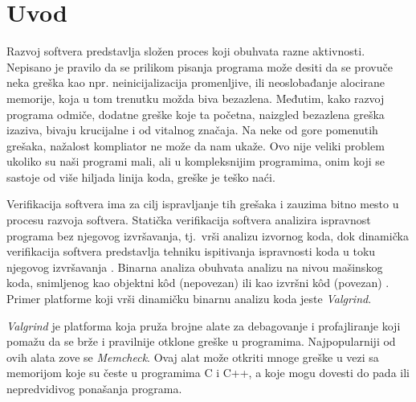 \documentclass[12pt,oneside]{memoir}
\theoremstyle{plain}
\theoremstyle{definition}
\begin{document}
\frontmatter
\naslovna
\komisija
\apstrakt
\tableofcontents*

\mainmatter

\chapter{Uvod}
Razvoj softvera predstavlja složen proces koji obuhvata razne aktivnosti. Nepisano je pravilo da se prilikom pisanja programa može desiti da se provuče neka greška kao npr. neinicijalizacija promenljive, ili neoslobađanje alocirane memorije, koja u tom trenutku možda biva bezazlena. Međutim, kako razvoj programa odmiče, dodatne greške koje ta početna, naizgled bezazlena greška izaziva, bivaju krucijalne i od vitalnog značaja. Na neke od gore pomenutih grešaka, nažalost kompliator ne može da nam ukaže. Ovo nije veliki problem ukoliko su naši programi mali, ali u  kompleksnijim programima, onim koji se sastoje od više hiljada linija koda, greške je teško naći. 

Verifikacija softvera ima za cilj ispravljanje tih grešaka i zauzima bitno mesto u procesu razvoja softvera. Statička verifikacija softvera analizira ispravnost programa bez njegovog izvršavanja, tj.~vrši analizu izvornog koda, dok dinamička verifikacija softvera predstavlja tehniku ispitivanja ispravnosti koda u toku njegovog izvršavanja \cite{02Motivacija}. Binarna analiza obuhvata analizu na nivou mašinskog koda, snimljenog kao objektni k\^od (nepovezan) ili kao izvršni k\^od (povezan) \cite{03DinamickaAnaliza}. Primer platforme koji vrši dinamičku binarnu analizu koda jeste \textit{Valgrind}.  

\textit{Valgrind} je platforma koja pruža brojne alate za debagovanje i profajliranje koji pomažu da se brže i pravilnije otklone greške u programima. Najpopularniji od ovih alata zove se \textit{Memcheck}. Ovaj alat može otkriti mnoge greške u vezi sa memorijom koje su česte u programima C i C++, a koje mogu dovesti do pada ili nepredvidivog ponašanja programa. 
\end{document}
